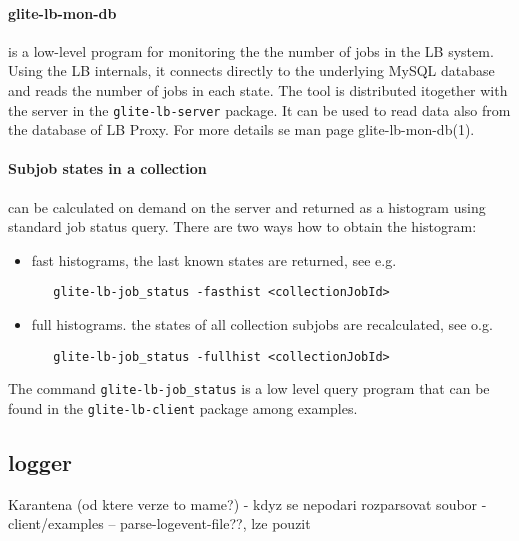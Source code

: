 \paragraph{glite-lb-mon-db} is a low-level program for monitoring the the
number of jobs in the LB system. Using the LB internals, it connects directly
to the underlying MySQL database and reads the number of jobs in each state.
The tool is distributed itogether with the server in the \verb'glite-lb-server' package.
It can be used to read data also from the database of LB Proxy.
For more details se man page glite-lb-mon-db(1).


\paragraph{Subjob states in a collection} can be calculated on demand on the server and
returned as a histogram using standard job status query. There are two ways how to obtain the 
histogram:
\begin{itemize}
\item fast histograms, the last known states are returned, see e.g.
\begin{verbatim}
   glite-lb-job_status -fasthist <collectionJobId>
\end{verbatim}
\item full histograms. the states of all collection subjobs are recalculated, see o.g.
\begin{verbatim}
   glite-lb-job_status -fullhist <collectionJobId>
\end{verbatim}
\end{itemize}
The command \verb'glite-lb-job_status' is a low level query program that can be
found in the \verb'glite-lb-client' package among examples.





\subsection{\LB logger}

\iffalse
{}

Karantena (od ktere verze to mame?)
- kdyz se nepodari rozparsovat soubor
- client/examples -- parse-logevent-file??, lze pouzit

